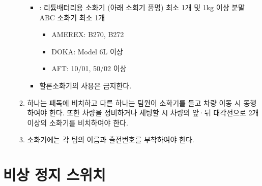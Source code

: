 \documentclass[final,a4paper,10pt]{report}
\begin{document}
\begin{enumerate}
\begin{enumerate}
\begin{itemize}
          \item {}: 리튬배터리용 소화기 (아래 소회기 품명) 최소 1개 및 1kg 이상 분말 ABC 소화기 최소 1개
            \begin{itemize}
              \item AMEREX: B270, B272
              \item DOKA: Model 6L 이상
              \item AFT: 10/01, 50/02 이상
            \end{itemize}
          \item 할론소화기의 사용은 금지한다.
        \end{itemize}
        
      \item 하나는 패독에 비치하고 다른 하나는 팀원이 소화기를 들고 차량 이동 시 동행하여야 한다. 또한 차량을 정비하거나 세팅할 시 차량의 앞·뒤 대각선으로 2개 이상의 소화기를 비치하여야 한다.
      \item 소화기에는 각 팀의 이름과 출전번호를 부착하여야 한다.
    \end{enumerate}
\end{enumerate}

\section{비상 정지 스위치} \label{section:비상 정지 스위치}
\end{document}
